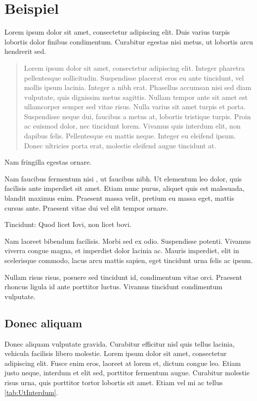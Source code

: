\chapter{Beispiel} \label{ch:Beispiel}
Lorem ipsum dolor sit amet, consectetur adipiscing elit. Duis varius turpis lobortis dolor finibus condimentum. Curabitur egestas nisi metus, ut lobortis arcu hendrerit sed. 
\begin{quote}Lorem ipsum dolor sit amet, consectetur adipiscing elit. Integer pharetra pellentesque sollicitudin. Suspendisse placerat eros eu ante tincidunt, vel mollis ipsum lacinia. Integer a nibh erat. Phasellus accumsan nisi sed diam vulputate, quis dignissim metus sagittis. Nullam tempor ante sit amet est ullamcorper semper sed vitae risus. Nulla varius sit amet turpis et porta. Suspendisse neque dui, faucibus a metus at, lobortis tristique turpis. Proin ac euismod dolor, nec tincidunt lorem. Vivamus quis interdum elit, non dapibus felis. Pellentesque eu mattis neque. Integer eu eleifend ipsum. Donec ultricies porta erat, molestie eleifend augue tincidunt at.\end{quote}
Nam fringilla egestas ornare. 

Nam faucibus fermentum nisi , ut faucibus nibh. Ut elementum leo dolor, quis facilisis ante imperdiet sit amet. Etiam nunc purus, aliquet quis est malesuada, blandit maximus enim. Praesent massa velit, pretium eu massa eget, mattis cursus ante. Praesent vitae dui vel elit tempor ornare. 
\begin{kischt}{Tincidunt:}
Quod licet Iovi, non licet bovi.

Nam laoreet bibendum facilisis. Morbi sed ex odio. Suspendisse potenti. Vivamus viverra congue magna, et imperdiet dolor lacinia ac. Mauris imperdiet, elit in scelerisque commodo, lacus arcu mattis sapien, eget tincidunt urna felis ac ipsum.
\end{kischt}
Nullam risus risus, posuere sed tincidunt id, condimentum vitae orci. Praesent rhoncus ligula id ante porttitor luctus. Vivamus tincidunt condimentum vulputate. 

\section{Donec aliquam} \label{sec:DonecAliquam}
 Donec aliquam vulputate gravida. Curabitur efficitur nisl quis tellus lacinia, vehicula facilisis libero molestie. Lorem ipsum dolor sit amet, consectetur adipiscing elit. Fusce enim eros, laoreet at lorem et, dictum congue leo. Etiam justo neque, interdum et elit sed, porttitor fermentum augue. Curabitur molestie risus urna, quis porttitor tortor lobortis sit amet. Etiam vel mi ac tellus \ref{tab:UtInterdum}.
 
